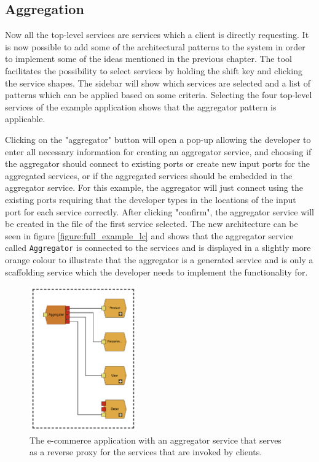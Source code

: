 \subsection{Aggregation}
Now all the top-level services are services which a client is directly requesting. It is now possible to add some of the architectural patterns to the system in order to implement some of the ideas mentioned in the previous chapter.
The tool facilitates the possibility to select services by holding the shift key and clicking the service shapes. The sidebar will show which services are selected and a list of patterns which can be applied based on some
criteria. Selecting the four top-level services of the example application shows that the aggregator pattern is applicable.

Clicking on the "aggregator" button will open a pop-up allowing the developer to enter all necessary information for creating an aggregator service, and choosing if the aggregator should connect to existing ports or create new input ports for the aggregated services, or if the aggregated services should be embedded in the aggregator service.
For this example, the aggregator will just connect using the existing ports requiring that the developer types in the locations of the input port for each service correctly.
After clicking "confirm", the aggregator service will be created in the file of the first service selected. The new architecture can be seen in figure \ref*{figure:full_example_lc} and shows that the aggregator service called \texttt{Aggregator} is connected to the services and is displayed in a slightly more orange colour 
to illustrate that the aggregator is a generated service and is only a scaffolding service which the developer needs to implement the functionality for.

\begin{figure}[h!]
    \center
    \includegraphics[width=0.41\textwidth]{figures/jv_aggregator.png}
    \caption{The e-commerce application with an aggregator service that serves as a reverse proxy for the services that are invoked by clients.}
    \label{figure:jv_aggregate}
\end{figure}

